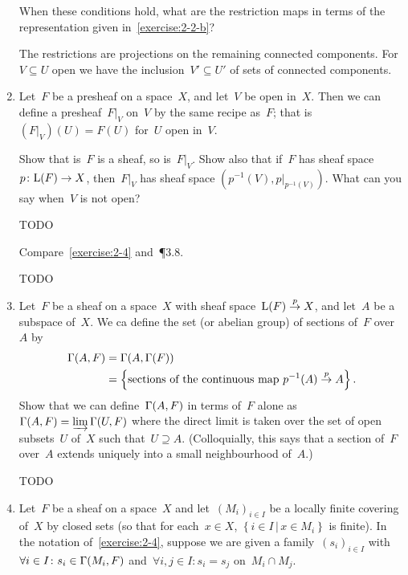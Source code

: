 \documentclass[a4paper,11pt,oneside,openany,article]{memoir}
\begin{document}
\begin{enumerate}
    When these conditions hold, what are the restriction maps in terms of the representation given in~\ref{exercise:2-2-b}?

    \begin{solution}
      The restrictions are projections on the remaining connected components. For~$V\subseteq U$ open we have the inclusion~$V'\subseteq U'$ of sets of connected components.
    \end{solution}

  \item Let~$F$ be a presheaf on a space~$X$, and let~$V$ be open in~$X$. Then we can define a presheaf~$F|_V$ on~$V$ by the same recipe as~$F$; that is~$(F|_V)(U)=F(U)$ for~$U$ open in~$V$.

    Show that is~$F$ is a sheaf, so is~$F|_V$. Show also that if~$F$ has sheaf space~$p\colon \mathrm{L}(F)\to X$, then~$F|_V$ has sheaf space $(p^{-1}(V),p|_{p^{-1}(V)})$. What can you say when~$V$ is not open?

    \begin{solution}
      TODO
    \end{solution}

    Compare~\ref{exercise:2-4} and~\P3.8.

    \begin{solution}
      TODO
    \end{solution}

  \item Let~$F$ be a sheaf on a space~$X$ with sheaf space~$\mathrm{L}(F)\overset{p}{\rightarrow} X$, and let~$A$ be a subspace of~$X$. We ca define the set (or abelian group) of sections of~$F$ over~$A$ by
    \begin{align}
      \mathrm{\Gamma}(A,F)&=\mathrm{\Gamma}(A,\mathrm{\Gamma}(F)) \\
      &=\left\{ \text{sections of the continuous map $p^{-1}(A)\overset{p}{\rightarrow}A$} \right\}.
    \end{align}
    Show that we can define~$\mathrm{\Gamma}(A,F)$ in terms of~$F$ alone as~$\mathrm{\Gamma}(A,F)=\varinjlim\mathrm{\Gamma}(U,F)$ where the direct limit is taken over the set of open subsets~$U$ of~$X$ such that~$U\supseteq A$. (Colloquially, this says that a section of~$F$ over~$A$ extends uniquely into a small neighbourhood of~$A$.)

    \begin{solution}
      TODO
    \end{solution}

  \item Let~$F$ be a sheaf on a space~$X$ and let~$(M_i)_{i\in I}$ be a locally finite covering of~$X$ by closed sets (so that for each~$x\in X$, $\left\{ i\in I\,|\,x\in M_i \right\}$ is finite). In the notation of~\ref{exercise:2-4}, suppose we are given a family~$(s_i)_{i\in I}$ with~$\forall i\in I\colon s_i\in\mathrm{\Gamma}(M_i,F)$ and~$\forall i,j\in I\colon s_i=s_j$ on~$M_i\cap M_j$.


\end{enumerate}
\end{document}
